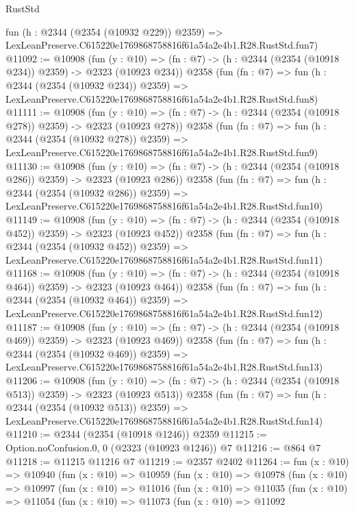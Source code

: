 \begin{lexlean}{RustStd}
\begin{coremodule}
    fun (h : @2344 (@2354 (@10932 @229)) @2359) =>
    LexLeanPreserve.C615220e1769868758816f61a54a2e4b1.R28.RustStd.fun7)
@11092 := @10908
    (fun (y : @10) => (fn : @7) -> (h : @2344 (@2354 (@10918 @234)) @2359) -> @2323 (@10923 @234))
    @2358
    (fun (fn : @7) =>
    fun (h : @2344 (@2354 (@10932 @234)) @2359) =>
    LexLeanPreserve.C615220e1769868758816f61a54a2e4b1.R28.RustStd.fun8)
@11111 := @10908
    (fun (y : @10) => (fn : @7) -> (h : @2344 (@2354 (@10918 @278)) @2359) -> @2323 (@10923 @278))
    @2358
    (fun (fn : @7) =>
    fun (h : @2344 (@2354 (@10932 @278)) @2359) =>
    LexLeanPreserve.C615220e1769868758816f61a54a2e4b1.R28.RustStd.fun9)
@11130 := @10908
    (fun (y : @10) => (fn : @7) -> (h : @2344 (@2354 (@10918 @286)) @2359) -> @2323 (@10923 @286))
    @2358
    (fun (fn : @7) =>
    fun (h : @2344 (@2354 (@10932 @286)) @2359) =>
    LexLeanPreserve.C615220e1769868758816f61a54a2e4b1.R28.RustStd.fun10)
@11149 := @10908
    (fun (y : @10) => (fn : @7) -> (h : @2344 (@2354 (@10918 @452)) @2359) -> @2323 (@10923 @452))
    @2358
    (fun (fn : @7) =>
    fun (h : @2344 (@2354 (@10932 @452)) @2359) =>
    LexLeanPreserve.C615220e1769868758816f61a54a2e4b1.R28.RustStd.fun11)
@11168 := @10908
    (fun (y : @10) => (fn : @7) -> (h : @2344 (@2354 (@10918 @464)) @2359) -> @2323 (@10923 @464))
    @2358
    (fun (fn : @7) =>
    fun (h : @2344 (@2354 (@10932 @464)) @2359) =>
    LexLeanPreserve.C615220e1769868758816f61a54a2e4b1.R28.RustStd.fun12)
@11187 := @10908
    (fun (y : @10) => (fn : @7) -> (h : @2344 (@2354 (@10918 @469)) @2359) -> @2323 (@10923 @469))
    @2358
    (fun (fn : @7) =>
    fun (h : @2344 (@2354 (@10932 @469)) @2359) =>
    LexLeanPreserve.C615220e1769868758816f61a54a2e4b1.R28.RustStd.fun13)
@11206 := @10908
    (fun (y : @10) => (fn : @7) -> (h : @2344 (@2354 (@10918 @513)) @2359) -> @2323 (@10923 @513))
    @2358
    (fun (fn : @7) =>
    fun (h : @2344 (@2354 (@10932 @513)) @2359) =>
    LexLeanPreserve.C615220e1769868758816f61a54a2e4b1.R28.RustStd.fun14)
@11210 := @2344 (@2354 (@10918 @1246)) @2359
@11215 := Option.noConfusion.{0, 0} (@2323 (@10923 @1246)) @7
@11216 := @864 @7
@11218 := @11215 @11216 @7
@11219 := @2357 @2402
@11264 := fun (x : @10) =>
  @10940
    (fun (x : @10) =>
    @10959
      (fun (x : @10) =>
      @10978
        (fun (x : @10) =>
        @10997
          (fun (x : @10) =>
          @11016
            (fun (x : @10) =>
            @11035
              (fun (x : @10) =>
              @11054
                (fun (x : @10) =>
                @11073
                  (fun (x : @10) =>
                  @11092

\end{coremodule}
\end{lexlean}
